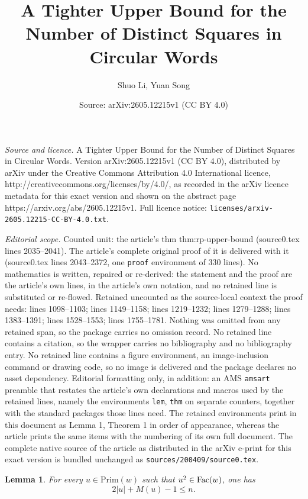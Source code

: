 \documentclass[10pt,a4paper]{amsart}
\title{A Tighter Upper Bound for the Number of Distinct Squares in Circular Words}
\author{Shuo Li, Yuan Song}
\date{Source: arXiv:2605.12215v1 (CC BY 4.0)}
\newtheorem{lem}{Lemma}
\newcommand{\fac}{\hbox{\rm Fac}}
\newcommand{\pri}{\mathrm{Prim}}
\begin{document}
\maketitle

\noindent\emph{Source and licence.} A Tighter Upper Bound for the Number of Distinct Squares in Circular Words. Version arXiv:2605.12215v1 (CC BY 4.0), distributed by arXiv under the Creative Commons Attribution 4.0 International licence, http://creativecommons.org/licenses/by/4.0/, as recorded in the arXiv licence metadata for this exact version and shown on the abstract page https://arxiv.org/abs/2605.12215v1. Full licence notice: \texttt{licenses/arxiv-2605.12215-CC-BY-4.0.txt}.\par\smallskip

\noindent\textit{Editorial scope.} Counted unit: the article's thm thm:rp-upper-bound (source0.tex lines 2035--2041). The article's complete original proof of it is delivered with it (source0.tex lines 2043--2372, one \texttt{proof} environment of 330 lines). No mathematics is written, repaired or re-derived: the statement and the proof are the article's own lines, in the article's own notation, and no retained line is substituted or re-flowed.  Retained uncounted as the source-local context the proof needs: lines 1098--1103; lines 1149--1158; lines 1219--1232; lines 1279--1288; lines 1383--1391; lines 1528--1553; lines 1755--1781.  Nothing was omitted from any retained span, so the package carries no omission record.  No retained line contains a citation, so the wrapper carries no bibliography and no bibliography entry.  No retained line contains a figure environment, an image-inclusion command or drawing code, so no image is delivered and the package declares no asset dependency.  Editorial formatting only, in addition: an AMS \texttt{amsart} preamble that restates the article's own declarations and macros used by the retained lines, namely the environments \texttt{lem}, \texttt{thm} on separate counters, together with the standard packages those lines need.  The retained environments print in this document as Lemma 1, Theorem 1 in order of appearance, whereas the article prints the same items with the numbering of its own full document.  The complete native source of the article as distributed in the arXiv e-print for this exact version is bundled unchanged as \texttt{sources/200409/source0.tex}.
\begin{lem}\label{restriction on length and number of sc}
For every $u\in\pri(w)$ such that $u^2\in\fac(w)$, one has
\[
2|u|+M(u)-1\le n.
\]
\end{lem}
\end{document}

